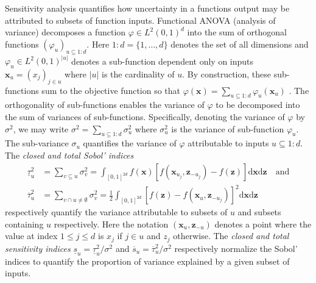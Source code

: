 \documentclass[graybox]{svmult}
\begin{document}
Sensitivity analysis quantifies how uncertainty in a functions output may be attributed to subsets of function inputs. Functional ANOVA (analysis of variance) decomposes a function $\varphi \in L^2(0,1)^{d}$ into the sum of orthogonal functions $(\varphi_u)_{u \subseteq {1:d}}$. Here $1:d=\{1,\dots,d\}$ denotes the set of all dimensions and $\varphi_u \in L^2(0,1)^{\lvert u \rvert}$ denotes a sub-function dependent only on inputs $\boldsymbol{x}_u = (x_j)_{j \in u}$ where $\lvert u \rvert$ is the cardinality of $u$. By construction, these sub-functions sum to the objective function so that $\varphi(\boldsymbol{x}) = \sum_{u \subseteq 1:d} \varphi_u(\boldsymbol{x}_u)$ \cite{hoeffding1992class}. 
The orthogonality of sub-functions enables the variance of $\varphi$ to be decomposed into the sum of variances of sub-functions. Specifically, denoting the variance of $\varphi$ by $\sigma^2$, we may write $\sigma^2 = \sum_{u \subseteq 1:d} \sigma^2_u$ where $\sigma^2_u$ is the variance of sub-function $\varphi_u$. The sub-variance $\sigma_u$ quantifies the variance of $\varphi$ attributable to inputs $u \subseteq 1:d$.  The \emph{closed and total Sobol' indices}
\begin{align*}
    \underline{\tau}_u^2 &= \sum_{v \subseteq u} \sigma^2_v = \int_{[0,1]^{2d}} f(\boldsymbol{x})[f(\boldsymbol{x}_{u_j},\boldsymbol{z}_{-{u_j}})-f(\boldsymbol{z})]\mathrm{d}\boldsymbol{x}\mathrm{d}\boldsymbol{z} \quad \text{and}  \\ 
    \overline{\tau}_u^2 &= \sum_{v \cap u \neq \emptyset} \sigma^2_v = \frac{1}{2}\int_{[0,1]^{2d}} [f(\boldsymbol{z})-f(\boldsymbol{x}_u,\boldsymbol{z}_{-{u_j}})]^2\mathrm{d}\boldsymbol{x}\mathrm{d}\boldsymbol{z}
    \label{SoRa_eq:sobol_indices}
\end{align*}
respectively quantify the variance attributable to subsets of $u$ and subsets containing $u$ respectively. Here the notation $(\boldsymbol{x}_{u},\boldsymbol{z}_{-u})$ denotes a point where the value at index $1 \leq j \leq d$ is $x_j$ if $j \in u$ and $z_j$ otherwise. The \emph{closed and total sensitivity indices} $\underline{s}_u = \underline{\tau}_u^2/\sigma^2$ and $\overline{s}_u = \overline{\tau}_u^2/\sigma^2$ respectively normalize the Sobol' indices to quantify the proportion of variance explained by a given subset of inputs. 
\end{document}
